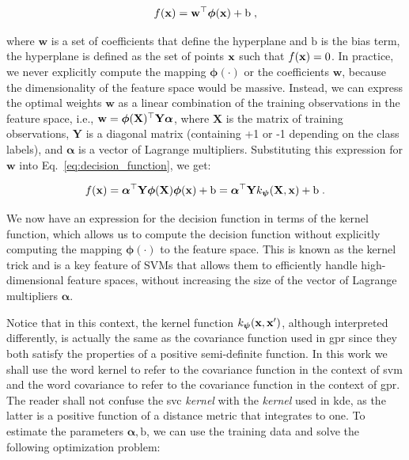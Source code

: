 \begin{equation}
  f(\mathbf{x}) = \mathbf{w}^{\top} \boldsymbol{\phi}(\mathbf{x}) + \mathrm{b}\;,
  \label{eq:decision_function}
\end{equation}

where $\mathbf{w}$ is a set of coefficients that define the hyperplane and $\mathrm{b}$ is the bias term, the hyperplane is defined as the set of points $\mathbf{x}$ such that $f(\mathbf{x}) = 0$. In practice, we never explicitly compute the mapping $\boldsymbol{\phi}(\cdot)$ or the coefficients $\mathbf{w}$, because the dimensionality of the feature space would be massive. Instead, we can express the optimal weights $\mathbf{w}$ as a linear combination of the training observations in the feature space, i.e., $\mathbf{w} = \boldsymbol{\phi}(\mathbf{X})^{\top} \mathbf{Y} \boldsymbol{\alpha}$, where $\mathbf{X}$ is the matrix of training observations, $\mathbf{Y}$ is a diagonal matrix (containing +1 or -1 depending on the class labels), and $\boldsymbol{\alpha}$ is a vector of Lagrange multipliers. Substituting this expression for $\mathbf{w}$ into Eq.~\eqref{eq:decision_function}, we get:

\begin{equation}
  f(\mathbf{x}) = \boldsymbol{\alpha}^{\top} \mathbf{Y} \boldsymbol{\phi}(\mathbf{X}) \boldsymbol{\phi}(\mathbf{x}) + \mathrm{b} = \boldsymbol{\alpha}^{\top} \mathbf{Y} k_{\boldsymbol{\psi}}(\mathbf{X}, \mathbf{x}) + \mathrm{b}\;.
  \label{eq:decision_function_kernel}
\end{equation}

We now have an expression for the decision function in terms of the kernel function, which allows us to compute the decision function without explicitly computing the mapping $\boldsymbol{\phi}(\cdot)$ to the feature space. This is known as the kernel trick and is a key feature of SVMs that allows them to efficiently handle high-dimensional feature spaces, without increasing the size of the vector of Lagrange multipliers $\boldsymbol{\alpha}$. 

\smallskip
Notice that in this context, the kernel function $k_{\boldsymbol{\psi}}(\mathbf{x}, \mathbf{x}')$, although interpreted differently, is actually the same as the covariance function used in \gls{gpr} since they both satisfy the properties of a positive semi-definite function. In this work we shall use the word kernel to refer to the covariance function in the context of \gls{svm} and the word covariance to refer to the covariance function in the context of \gls{gpr}. The reader shall not confuse the \gls{svc} \textit{kernel} with the \textit{kernel} used in \gls{kde}, as the latter is a positive function of a distance metric that integrates to one. To estimate the parameters $\boldsymbol{\alpha}, \mathrm{b}$, we can use the training data and solve the following optimization problem:

